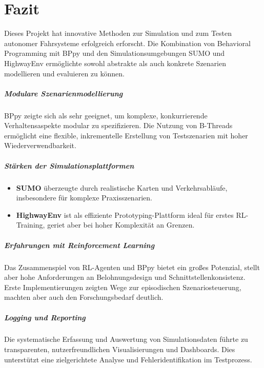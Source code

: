 \chapter{Fazit}

Dieses Projekt hat innovative Methoden zur Simulation und zum Testen autonomer Fahrsysteme erfolgreich erforscht. Die Kombination von Behavioral Programming mit BPpy und den Simulationsumgebungen SUMO und HighwayEnv ermöglichte sowohl abstrakte als auch konkrete Szenarien modellieren und evaluieren zu können.

\paragraph{Modulare Szenarienmodellierung}
BPpy zeigte sich als sehr geeignet, um komplexe, konkurrierende Verhaltensaspekte modular zu spezifizieren. Die Nutzung von B-Threads ermöglicht eine flexible, inkrementelle Erstellung von Testszenarien mit hoher Wiederverwendbarkeit.

\paragraph{Stärken der Simulationsplattformen}
\begin{itemize}
    \item \textbf{SUMO} überzeugte durch realistische Karten und Verkehrsabläufe, insbesondere für komplexe Praxisszenarien.
    \item \textbf{HighwayEnv} ist als effiziente Prototyping-Plattform ideal für erstes RL-Training, geriet aber bei hoher Komplexität an Grenzen.
\end{itemize}

\paragraph{Erfahrungen mit Reinforcement Learning}
Das Zusammenspiel von RL-Agenten und BPpy bietet ein großes Potenzial, stellt aber hohe Anforderungen an Belohnungsdesign und Schnittstellenkonsistenz. Erste Implementierungen zeigten Wege zur episodischen Szenariosteuerung, machten aber auch den Forschungsbedarf deutlich.

\paragraph{Logging und Reporting}
Die systematische Erfassung und Auswertung von Simulationsdaten führte zu transparenten, nutzerfreundlichen Visualisierungen und Dashboards. Dies unterstützt eine zielgerichtete Analyse und Fehleridentifikation im Testprozess.

